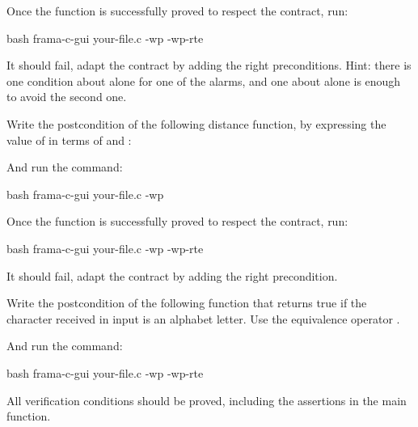 Once the function is successfully proved to respect the contract, run:


\begin{CodeBlock}{bash}
frama-c-gui your-file.c -wp -wp-rte
\end{CodeBlock}


It should fail, adapt the contract by adding the right preconditions. Hint:
there is one condition about  alone for one of the alarms, and
one about  alone is enough to avoid the second one.






Write the postcondition of the following distance function, by expressing
the value of  in terms of  and
:




And run the command:


\begin{CodeBlock}{bash}
frama-c-gui your-file.c -wp
\end{CodeBlock}


Once the function is successfully proved to respect the contract, run:


\begin{CodeBlock}{bash}
frama-c-gui your-file.c -wp -wp-rte
\end{CodeBlock}


It should fail, adapt the contract by adding the right precondition.







Write the postcondition of the following function that returns true if
the character received in input is an alphabet letter. Use the equivalence
operator \CodeInline{<==>}.





And run the command:


\begin{CodeBlock}{bash}
frama-c-gui your-file.c -wp -wp-rte
\end{CodeBlock}


All verification conditions should be proved, including the assertions in the
main function.


